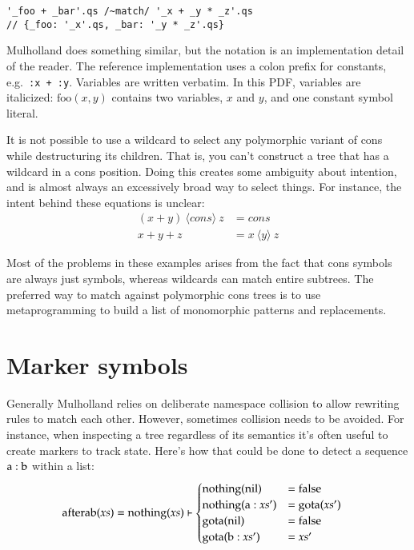\documentclass{report}
\def\rewrite {\vdash}
\begin{document}
\begin{verbatim}
'_foo + _bar'.qs /~match/ '_x + _y * _z'.qs
// {_foo: '_x'.qs, _bar: '_y * _z'.qs}
\end{verbatim}

    Mulholland does something similar, but the notation is an implementation detail of the reader. The reference implementation uses a colon prefix for constants, e.g.~{\tt :x + :y}. Variables
    are written verbatim. In this PDF, variables are italicized: $\textrm{foo}(x, y)$ contains two variables, $x$ and $y$, and one constant symbol literal.

    It is not possible to use a wildcard to select any polymorphic variant of cons while destructuring its children. That is, you can't construct a tree that has a wildcard in a cons position.
    Doing this creates some ambiguity about intention, and is almost always an excessively broad way to select things. For instance, the intent behind these equations is unclear:
\begin{align*}
(x + y)~\langle cons\rangle~z & = cons \\
x + y + z                     & = x~\langle y\rangle~z
\end{align*}

    Most of the problems in these examples arises from the fact that cons symbols are always just symbols, whereas wildcards can match entire subtrees. The preferred way to match against
    polymorphic cons trees is to use metaprogramming to build a list of monomorphic patterns and replacements.

\section{Marker symbols}
    Generally Mulholland relies on deliberate namespace collision to allow rewriting rules to match each other. However, sometimes collision needs to be avoided. For instance, when inspecting
    a tree regardless of its semantics it's often useful to create markers to track state. Here's how that could be done to detect a sequence $\textrm a : \textrm b$ within a list:
\begin{align*}
\textrm{afterab}(xs) & = \textrm{nothing}(xs) \rewrite \begin{cases}
                                                       \textrm{nothing}(\textrm{nil})    & = \textrm{false} \\
                                                       \textrm{nothing}(\textrm a : xs') & = \textrm{gota}(xs') \\
                                                       \textrm{gota}(\textrm{nil})       & = \textrm{false} \\
                                                       \textrm{gota}(\textrm b : xs')    & = xs'
                                                     \end{cases}
\end{align*}
\end{document}
